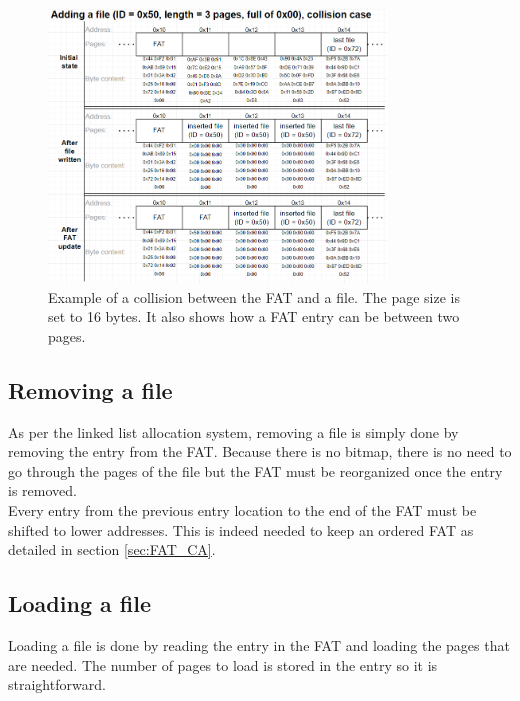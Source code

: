 \documentclass[10pt,a4paper]{ULBreport}
\begin{document}
\begin{figure}
    \centering
    \includegraphics[width=0.8\textwidth]{FAT_collision_CA.png}
    \caption{Example of a collision between the FAT and a file. The page size is set to 16 bytes. It also shows how a FAT entry can be between two pages.}
    \label{fig:FAT_collision}
\end{figure}
\subsection{Removing a file}
As per the linked list allocation system, removing a file is simply done by removing the entry from the FAT. Because there is no bitmap, there is no need to go through the pages of the file but the FAT must be reorganized once the entry is removed. \\
Every entry from the previous entry location to the end of the FAT must be shifted to lower addresses. This is indeed needed to keep an ordered FAT as detailed in section \ref{sec:FAT_CA}. 
\subsection{Loading a file}
Loading a file is done by reading the entry in the FAT and loading the pages that are needed. The number of pages to load is stored in the entry so it is straightforward.
\end{document}
